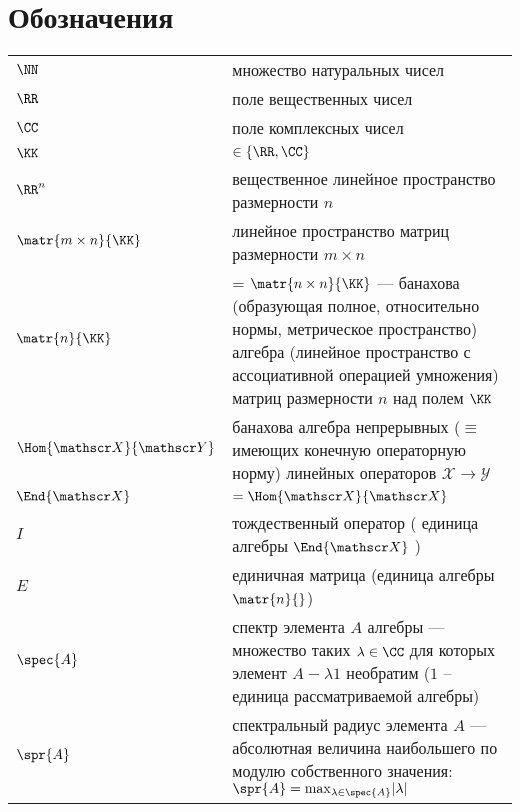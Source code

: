 \section{Обозначения}

\begin{tabularx}{\textwidth}{l X}
\( \NN \) & множество натуральных чисел \\
\( \RR \) & поле вещественных чисел \\
\( \CC \) & поле комплексных чисел \\
\( \KK \) & \( \in \{ \RR, \CC \} \) \\
\( \RR^n \) & вещественное линейное пространство размерности \( n \) \\
\( \matr{m\times n}{\KK} \) & линейное пространство матриц размерности \( m\times n \) \\
\( \matr{n}{\KK} \) & = \( \matr{n\times n}{\KK} \) ---
                        банахова (образующая полное, относительно нормы, метрическое пространство)
                        алгебра (линейное пространство с ассоциативной операцией умножения)
                        матриц размерности \( n \) над полем \( \KK \) \\
\( \Hom{\mathscr X}{\mathscr Y} \) & банахова алгебра непрерывных (\(\equiv\) имеющих конечную операторную норму)
                                        линейных операторов
                                        \(\mathscr X\to\mathscr Y\) \\
\( \End{\mathscr X} \) & \( = \Hom{\mathscr X}{\mathscr X} \) \\
\( I \) & тождественный оператор ( единица алгебры \( \End{\mathscr X} \) ) \\
\( E \) & единичная матрица (единица алгебры \(\matr{n}{}\)) \\
\( \spec{A} \) & спектр элемента \( A \) алгебры --- множество таких \( \lambda\in\CC \)
                 для которых элемент \( A - \lambda 1 \) необратим
                 (\( 1 \) -- единица рассматриваемой алгебры) \\
\( \spr{A} \) & спектральный радиус элемента \( A \) --- абсолютная величина
                наибольшего по модулю собственного значения:
                \( \spr{A} = \max_{\lambda\in\spec{A}} \lvert\lambda\rvert \)
\end{tabularx}
